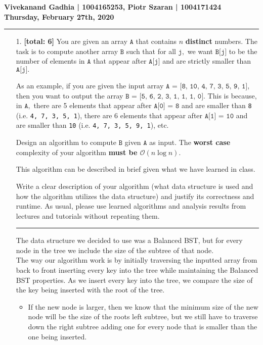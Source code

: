 \documentclass{assignment-263}
\newcommand{\bigOh}{\mathcal{O}}
\begin{document}
\vskip10pt
\textbf{Vivekanand Gadhia | 1004165253, \hskip7pt   Piotr Szaran | 1004171424 \hskip60pt Thursday, February 27th, 2020} 
\newline
\hrule 
\vskip30pt

  \begin{enumerate}

%  
\item[1.] \textbf{[total: 6]}
  You are given an array $\texttt{A}$ that contains $n$ \textbf{distinct}
  numbers. The task is to compute another array $\texttt{B}$ such that for all
  $\texttt{j},$ we want $\texttt{B[j]}$ to be the number of elements in
  $\texttt{A}$ that appear after $\texttt{A[j]}$ and are strictly
  smaller than $\texttt{A[j]}.$

  As an example, if you are given the input array
  $\texttt{A = [8, 10, 4, 7, 3, 5, 9, 1]},$ then you want to output
  the array $\texttt{B = [5, 6, 2, 3, 1, 1, 1, 0]}.$ This is because,
  in $\texttt{A},$ there are 5 elements that appear after
  $\texttt{A[0] = 8}$ and are smaller than \texttt{8} (i.e. \texttt{4,
    7, 3, 5, 1}), there are 6 elements that appear after
  $\texttt{A[1] = 10}$ and are smaller than \texttt{10}
  (i.e. \texttt{4, 7, 3, 5, 9, 1}), etc.
  

  Design an algorithm to compute $\texttt{B}$ given $\texttt{A}$ as
  input. The \textbf{worst case} complexity of your algorithm
  \textbf{must be $\bigOh(n\log n)$}.

  This algorithm can be described in brief given what we have learned
  in class. 
  
  Write a clear description of your algorithm (what data structure is
  used and how the algorithm utilizes the data structure) and justify
  its correctness and runtime. As usual, please use learned algorithms
  and analysis results from lectures and tutorials without repeating
  them. \newline \hrule \vskip14pt
  
  The data structure we decided to use was a Balanced BST, but for every node in the tree we include the size of the subtree of that node.\\
  
  The way our algorithm work is by initially traversing the inputted array from back to front inserting every key into the tree while maintaining the Balanced BST properties. As we insert every key into the tree, we compare the size of the key being inserted with the root of the tree. \\
  \begin{itemize}
  \item If the new node is larger, then we know that the minimum size of the new node will be the size of the roots left subtree, but we still have to traverse down the right subtree adding one for every node that is smaller than the one being inserted. \\
  

\end{itemize}
\end{enumerate}
\end{document}
